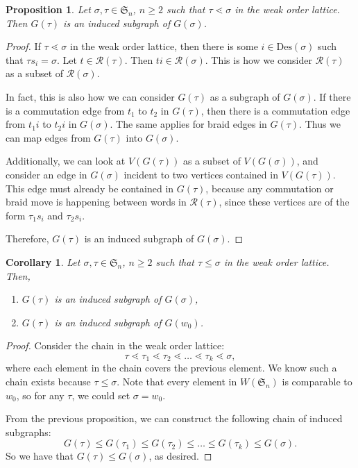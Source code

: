 \documentclass[11pt,reqno]{amsart}
\newtheorem{proposition}[theorem]{Proposition}
\newtheorem{corollary}[theorem]{Corollary}
\theoremstyle{definition}
\theoremstyle{notation}
\newcommand{\Des}{\text{Des}}
\newcommand{\calR}{\mathcal{R}}
\newcommand{\Sym}{\mathfrak{S}}
\begin{document}
\begin{proposition}\label{graph1}
Let $\sigma, \tau\in \mathfrak{S}_n$, $n\geq 2$ such that $\tau \lessdot \sigma$ in the weak order lattice. Then $G(\tau)$ is an induced subgraph of $G(\sigma)$. 
\end{proposition}

\begin{proof}
If $\tau\lessdot \sigma$ in the weak order lattice, then there is some $i\in \Des(\sigma)$ such that $\tau s_i = \sigma$. Let $t \in \calR(\tau)$. Then $ti\in \calR(\sigma)$. This is how we consider $\calR(\tau)$ as a subset of $\calR(\sigma)$. 

In fact, this is also how we can consider $G(\tau)$ as a subgraph of $G(\sigma)$. If there is a commutation edge from $t_1$ to $t_2$ in $G(\tau)$, then there is a commutation edge from $t_1i$ to $t_2i$ in $G(\sigma)$. The same applies for braid edges in $G(\tau)$. Thus we can map edges from $G(\tau)$ into $G(\sigma)$. 

Additionally, we can look at $V(G(\tau))$ as a subset of $V(G(\sigma))$, and consider an edge in $G(\sigma)$ incident to two vertices contained in $V(G(\tau))$. This edge must already be contained in $G(\tau)$, because any commutation or braid move is happening between words in $\calR(\tau)$, since these vertices are of the form $\tau_1s_i$ and $\tau_2 s_i$.

Therefore, $G(\tau)$ is an induced subgraph of $G(\sigma)$.
\end{proof}

\begin{corollary}
Let $\sigma, \tau\in \mathfrak{S}_n$, $n\geq 2$ such that $\tau \leq \sigma$ in the weak order lattice. Then,
\begin{enumerate}
    \item $G(\tau)$ is an induced subgraph of $G(\sigma)$,
    \item $G(\tau)$ is an induced subgraph of $G(w_0)$.
\end{enumerate}
\end{corollary}

\begin{proof}
Consider the chain in the weak order lattice:
\[
\tau \lessdot \tau_1 \lessdot \tau_2 \lessdot \ldots \lessdot \tau_k \lessdot \sigma,
\]
where each element in the chain covers the previous element. We know such a chain exists because $\tau \leq \sigma$. Note that every element in $W(\Sym_n)$ is comparable to $w_0$, so for any $\tau$, we could set $\sigma = w_0$.

From the previous proposition, we can construct the following chain of induced subgraphs:
\[
G(\tau) \leq G(\tau_1) \leq G(\tau_2) \leq \ldots \leq G(\tau_k) \leq G(\sigma).
\]
So we have that $G(\tau) \leq G(\sigma)$, as desired.
\end{proof}
\end{document}
